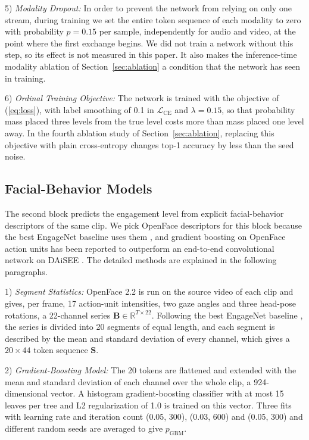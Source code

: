 \documentclass[journal]{IEEEtran}
\begin{document}
5) \emph{Modality Dropout:} In order to prevent the network from relying on only one stream, during training we set the entire token sequence of each modality to zero with probability $p = 0.15$ per sample, independently for audio and video, at the point where the first exchange begins. We did not train a network without this step, so its effect is not measured in this paper. It also makes the inference-time modality ablation of Section~\ref{sec:ablation} a condition that the network has seen in training.

6) \emph{Ordinal Training Objective:} The network is trained with the objective of (\ref{eq:loss}), with label smoothing of 0.1 in $\mathcal{L}_{\mathrm{CE}}$ and $\lambda = 0.15$, so that probability mass placed three levels from the true level costs more than mass placed one level away. In the fourth ablation study of Section~\ref{sec:ablation}, replacing this objective with plain cross-entropy changes top-1 accuracy by less than the seed noise.

\subsection{Facial-Behavior Models}
\label{sec:method_beh}

The second block predicts the engagement level from explicit facial-behavior descriptors of the same clip. We pick OpenFace descriptors for this block because the best EngageNet baseline uses them \cite{singh2023engagenet}, and gradient boosting on OpenFace action units has been reported to outperform an end-to-end convolutional network on DAiSEE \cite{das2025optimizing}. The detailed methods are explained in the following paragraphs.

1) \emph{Segment Statistics:} OpenFace 2.2 \cite{baltrusaitis2018openface} is run on the source video of each clip and gives, per frame, 17 action-unit intensities, two gaze angles and three head-pose rotations, a 22-channel series $\mathbf{B} \in \mathbb{R}^{T \times 22}$. Following the best EngageNet baseline \cite{singh2023engagenet}, the series is divided into 20 segments of equal length, and each segment is described by the mean and standard deviation of every channel, which gives a $20 \times 44$ token sequence $\mathbf{S}$.

2) \emph{Gradient-Boosting Model:} The 20 tokens are flattened and extended with the mean and standard deviation of each channel over the whole clip, a 924-dimensional vector. A histogram gradient-boosting classifier with at most 15 leaves per tree and L2 regularization of 1.0 is trained on this vector. Three fits with learning rate and iteration count (0.05, 300), (0.03, 600) and (0.05, 300) and different random seeds are averaged to give $p_{\mathrm{GBM}}$.
\end{document}
